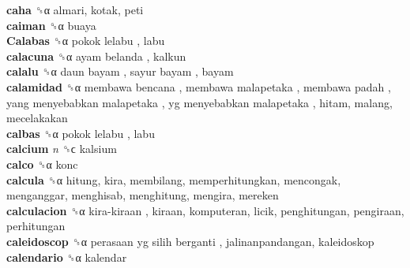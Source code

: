 \textbf{caha} ␝α  almari, kotak, peti  \\
\textbf{caiman} ␝α  buaya  \\
\textbf{Calabas} ␝α   pokok lelabu , labu  \\
\textbf{calacuna} ␝α   ayam belanda , kalkun  \\
\textbf{calalu} ␝α   daun bayam ,  sayur bayam , bayam  \\
\textbf{calamidad} ␝α   membawa bencana ,  membawa malapetaka ,  membawa padah ,  yang menyebabkan malapetaka ,  yg menyebabkan malapetaka , hitam, malang, mecelakakan  \\
\textbf{calbas} ␝α   pokok lelabu , labu  \\
\textbf{calcium} \emph{n}  ␝ϲ  kalsium  \\
\textbf{calco} ␝α  konc  \\
\textbf{calcula} ␝α  hitung, kira, membilang, memperhitungkan, mencongak, menganggar, menghisab, menghitung, mengira, mereken  \\
\textbf{calculacion} ␝α   kira-kiraan , kiraan, komputeran, licik, penghitungan, pengiraan, perhitungan  \\
\textbf{caleidoscop} ␝α   perasaan yg silih berganti , jalinanpandangan, kaleidoskop  \\
\textbf{calendario} ␝α  kalendar  \\
